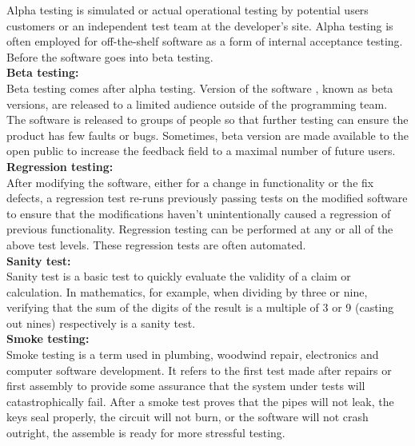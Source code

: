 Alpha testing is simulated or actual operational testing by potential users customers or an independent test team at the developer's 
site. Alpha testing is often employed for off-the-shelf software as a form of internal acceptance testing. Before the software goes 
into beta testing.\\[0.5cm]
\textbf{Beta testing:}\\
\hspace*{0.82cm}Beta testing comes after alpha testing. Version of the software , known as beta versions, are released to a limited 
audience outside of the programming team. The software is released to groups of people so that further testing can ensure the product 
has few faults or bugs. Sometimes, beta version are made available to the open public to increase the feedback field to a maximal 
number of future users.\\[0.5cm]
\textbf{Regression testing:}\\
\hspace*{0.82cm}After modifying the software, either for a change in functionality or the fix defects, a regression test re-runs 
previously passing tests on the modified software to ensure that the modifications haven't unintentionally caused a regression of 
previous functionality. Regression testing can be performed at any or all of the above test levels. These regression tests are 
often automated.\\[0.5cm] 
\textbf{Sanity test:}\\
\hspace*{0.82cm}Sanity test is a basic test to quickly evaluate the validity of a claim or calculation. In mathematics, for example, 
when dividing by three or nine, verifying that the sum of the digits of the result is a multiple of 3 or 9 (casting out nines) 
respectively is a sanity test.\\[0.5cm]
\textbf{Smoke testing:}\\
\hspace*{0.82cm}Smoke testing is a term used in plumbing, woodwind repair, electronics and computer software development. It refers 
to the first test made after repairs or first assembly to provide some assurance that the system under tests will catastrophically 
fail. After a smoke test proves that the pipes will not leak, the keys seal properly, the circuit will not burn, or the software will 
not crash outright, the assemble is ready for more stressful testing.
\newpage

